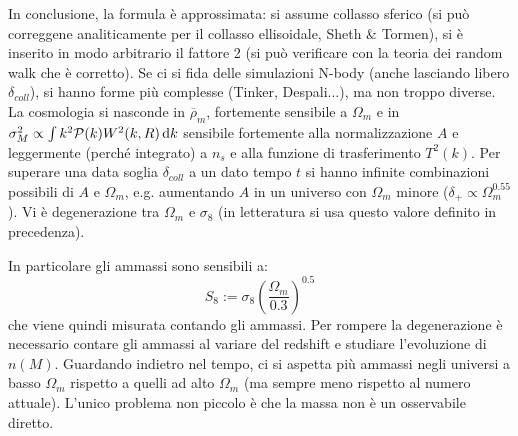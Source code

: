 In conclusione, la formula è approssimata: si assume collasso sferico (si può correggene analiticamente per il collasso ellisoidale, Sheth \& Tormen), si è inserito in modo arbitrario il fattore 2 (si può verificare con la teoria dei random walk che è corretto). Se ci si fida delle simulazioni N-body (anche lasciando libero $\delta_{coll}$), si hanno forme più complesse (Tinker, Despali...), ma non troppo diverse. La cosmologia si nasconde in $\overbar{\rho}_m$, fortemente sensibile a $\Omega_m$ e in $\sigma_M^2\propto \int k^2 \mathcal{P}(k)W^2(k,R)\operatorname{d}\!{k}$ sensibile fortemente alla normalizzazione $A$ e leggermente (perché integrato) a $n_s$ e alla funzione di trasferimento $T^2(k)$. Per superare una data soglia $\delta_{coll}$ a un dato tempo $t$ si hanno infinite combinazioni possibili di $A$ e $\Omega_m$, e.g. aumentando $A$ in un universo con $\Omega_m$ minore ($\delta_+ \propto \Omega_m^{0.55}$). Vi è degenerazione tra $\Omega_m$ e $\sigma_8$ (in letteratura si usa questo valore definito in precedenza). 

In particolare gli ammassi sono sensibili a:
\begin{equation}
    S_8 := \sigma_8 \left(\frac{\Omega_m}{0.3}\right)^{0.5}
\end{equation}
che viene quindi misurata contando gli ammassi. Per rompere la degenerazione è necessario contare gli ammassi al variare del redshift e studiare l'evoluzione di $n(M)$. Guardando indietro nel tempo, ci si aspetta più ammassi negli universi a basso $\Omega_m$ rispetto a quelli ad alto $\Omega_m$ (ma sempre meno rispetto al numero attuale). L'unico problema non piccolo è che la massa non è un osservabile diretto.

